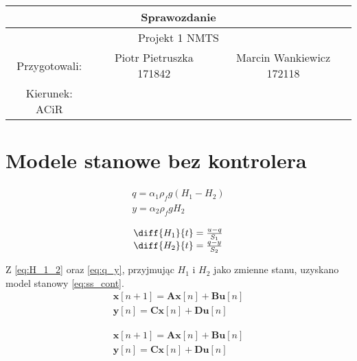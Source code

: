 \documentclass{article}
\begin{document}
\begin{tabular}{|c|c|c|}
\hline 
\multicolumn{3}{|c|}{\huge Sprawozdanie } \\ 
\hline 
\multicolumn{3}{|c|}{\LARGE Projekt 1  NMTS} \\ 
\hline 
\Large Przygotowali: &\Large Piotr Pietruszka 171842 &\Large Marcin Wankiewicz 172118  \\ 
\hline 
\Large Kierunek: ACiR  \\ 
\hline 
 
\end{tabular} 

\section{Modele stanowe bez kontrolera}
\begin{equation}\label{eq:q_y}
 \begin{array}{l}
  q = \alpha_1 \rho_f g (H_1 - H_2) \\
  y = \alpha_2 \rho_f g H_2
\end{array}
\end{equation}


\begin{equation}\label{eq:H_1_2}
 \begin{array}{l}
  \diff{H_1}{t} = \frac{u-q}{S_1} \\
  \diff{H_2}{t} = \frac{q-y}{S_2}
 \end{array}
\end{equation}

Z \ref{eq:H_1_2} oraz \ref{eq:q_y}, przyjmując $H_1$ i $H_2$ jako zmienne stanu, uzyskano model stanowy \ref{eq:ss_cont}.
\begin{equation}\label{eq:stan_disc}
 \begin{array}{l}
  \mathbf{x}[n+1] = \mathbf{A}\mathbf{x}[n] + \mathbf{B}\mathbf{u}[n] \\
  \mathbf{y}[n]= \mathbf{C} \mathbf{x}[n] + \mathbf{D}\mathbf{u}[n]
\end{array}
\end{equation}


\begin{equation}\label{eq:stan_disc}
 \begin{array}{l}
  \mathbf{x}[n+1] = \mathbf{A}\mathbf{x}[n] + \mathbf{B}\mathbf{u}[n] \\
  \mathbf{y}[n]= \mathbf{C} \mathbf{x}[n] + \mathbf{D}\mathbf{u}[n]
\end{array}
\end{equation}
\end{document}
